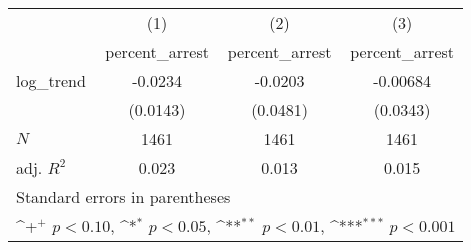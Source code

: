 {
\def\sym#1{\ifmmode^{#1}\else\(^{#1}\)\fi}
\begin{tabular}{l*{3}{c}}
\hline\hline
            &\multicolumn{1}{c}{(1)}&\multicolumn{1}{c}{(2)}&\multicolumn{1}{c}{(3)}\\
            &\multicolumn{1}{c}{percent\_arrest}&\multicolumn{1}{c}{percent\_arrest}&\multicolumn{1}{c}{percent\_arrest}\\
\hline
log\_trend   &     -0.0234         &     -0.0203         &    -0.00684         \\
            &    (0.0143)         &    (0.0481)         &    (0.0343)         \\
\hline
\(N\)       &        1461         &        1461         &        1461         \\
adj. \(R^{2}\)&       0.023         &       0.013         &       0.015         \\
\hline\hline
\multicolumn{4}{l}{\footnotesize Standard errors in parentheses}\\
\multicolumn{4}{l}{\footnotesize \sym{+} \(p<0.10\), \sym{*} \(p<0.05\), \sym{**} \(p<0.01\), \sym{***} \(p<0.001\)}\\
\end{tabular}
}
